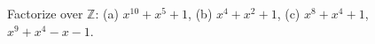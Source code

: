 Factorize over $\mathbb{Z}$: (a) $x^{10} + x^5 + 1$, (b) $x^4 + x^2 + 1$, (c) $x^8 + x^4 + 1$, $x^9 + x^4 - x - 1$.
